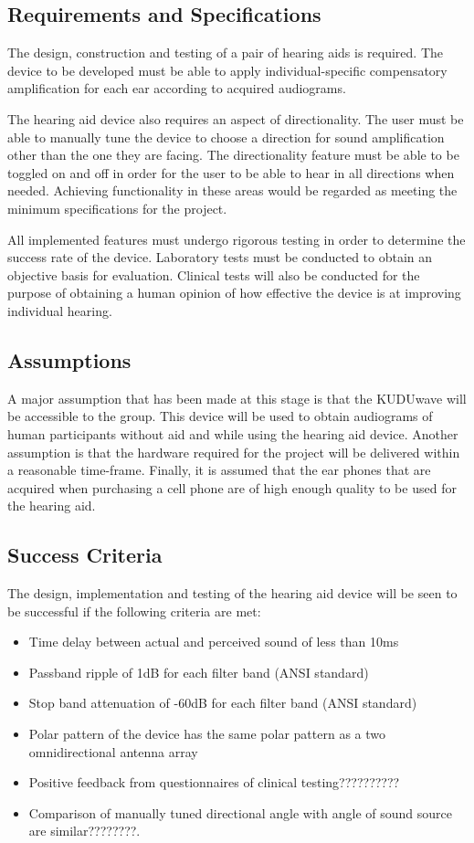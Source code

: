 \documentclass[10pt,twocolumn]{witseiepaper}
\begin{document}
\subsection{Requirements and Specifications}
The design, construction and testing of a pair of hearing aids is required. The device to be developed must be able to apply individual-specific compensatory amplification for each ear according to acquired audiograms. 

The hearing aid device also requires an aspect of directionality. The user must be able to manually tune the device to choose a direction for sound amplification other than the one they are facing. The directionality feature must be able to be toggled on and off in order for the user to be able to hear in all directions when needed. Achieving functionality in these areas would be regarded as meeting the minimum specifications for the project. 

All implemented features must undergo rigorous testing in order to determine the success rate of the device. Laboratory tests must be conducted to obtain an objective basis for evaluation. Clinical tests will also be conducted for the purpose of obtaining a human opinion of how effective the device is at improving individual hearing. 

\subsection{Assumptions}
A major assumption that has been made at this stage is that the KUDUwave will be accessible to the group. This device will be used to obtain audiograms of human participants without aid and while using the hearing aid device. Another assumption is that the hardware required for the project will be delivered within a reasonable time-frame. Finally, it is assumed that the ear phones that are acquired when purchasing a cell phone are of high enough quality to be used for the hearing aid.

\subsection{Success Criteria}
The design, implementation and testing of the hearing aid device will be seen to be successful if the following criteria are met:

\begin{itemize}
	\item Time delay between actual and perceived sound of less than 10ms
	\item Passband ripple of 1dB for each filter band (ANSI standard)
	\item Stop band attenuation of -60dB for each filter band (ANSI standard)
	\item Polar pattern of the device has the same polar pattern as a two omnidirectional antenna array
	\item Positive feedback from questionnaires of clinical testing??????????
	\item Comparison of manually tuned directional angle with angle of sound source are similar????????. 	
\end{itemize}
\end{document}
